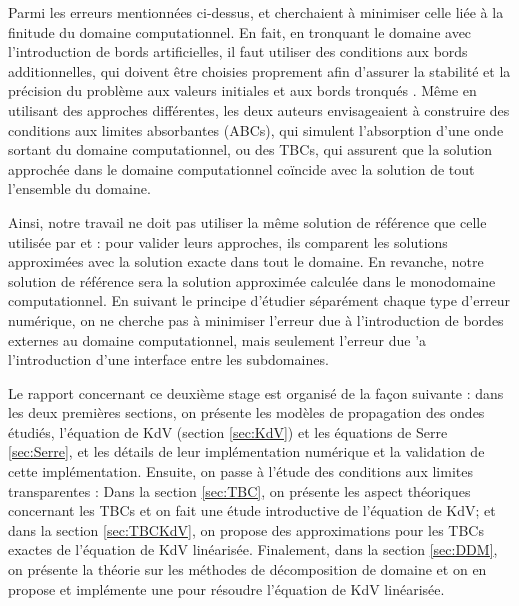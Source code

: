 \indent Parmi les erreurs mentionnées ci-dessus, \cite{zheng2008} et \cite{besse2015} cherchaient à minimiser celle liée à la finitude du domaine computationnel. En fait, en tronquant le domaine avec l'introduction de bords artificielles, il faut utiliser des conditions aux bords additionnelles, qui doivent être choisies proprement afin d'assurer la stabilité et la précision du problème aux valeurs initiales et aux bords tronqués \cite{zheng2008}. Même en utilisant des approches différentes, les deux auteurs envisageaient à construire des conditions aux limites absorbantes (ABCs), qui simulent l'absorption d'une onde sortant du domaine computationnel, ou des TBCs, qui assurent que la solution approchée dans le domaine computationnel coïncide avec la solution de tout l'ensemble du domaine.

\indent Ainsi, notre travail ne doit pas utiliser la même solution de référence que celle utilisée par \cite{zheng2008} et \cite{besse2015} : pour valider leurs approches, ils comparent les solutions approximées avec la solution exacte dans tout le domaine. En revanche, notre solution de référence sera la solution approximée calculée dans le monodomaine computationnel. En suivant le principe d'étudier séparément chaque type d'erreur numérique, on ne cherche pas à minimiser l'erreur due à l'introduction de bordes externes au domaine computationnel, mais seulement l'erreur due 'a l'introduction d'une interface entre les subdomaines.

\indent

\indent Le rapport concernant ce deuxième stage est organisé de la façon suivante : dans les deux premières sections, on présente les modèles de propagation des ondes étudiés, l'équation de KdV (section \ref{sec:KdV}) et les équations de Serre \ref{sec:Serre}, et les détails de leur implémentation numérique et la validation de cette implémentation. Ensuite, on passe à l'étude des conditions aux limites transparentes :  Dans la section \ref{sec:TBC}, on présente les aspect théoriques concernant les TBCs et on fait une étude introductive de l'équation de KdV; et dans la section \ref{sec:TBCKdV}, on propose des approximations pour les TBCs exactes de l'équation de KdV linéarisée. Finalement, dans la section \ref{sec:DDM}, on présente la théorie sur les méthodes de décomposition de domaine et on en propose et implémente une pour résoudre l'équation de KdV linéarisée.